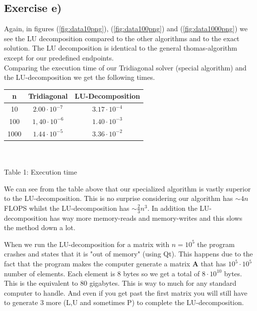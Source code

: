 \documentclass{article}
\begin{document}
  \subsection{Exercise e)} \label{Results e)}

  Again, in figures (\ref{fig:data10png}), (\ref{fig:data100png}) and (\ref{fig:data1000png}) we see the LU decomposition compared to the other algorithms and to the exact solution. The LU decomposition is identical to the general thomas-algorithm except for our predefined endpoints.\\
  Comparing the execution time of our Tridiagonal solver (special algorithm) and the LU-decomposition we get the following times.
  \begin{center} \label{tab:exec_time}
      \begin{tabular}{|c|c|c|}
        \hline
        n    &   Tridiagonal      &  LU-Decomposition  \\
        \hline\hline
        10   & $2.00\cdot10^{-7}$ & $3.17\cdot10^{-4}$ \\
        100  & $1,40\cdot10^{-6}$ & $1.40\cdot10^{-3}$ \\
        1000 & $1.44\cdot10^{-5}$ & $3.36\cdot10^{-2}$ \\
        \hline
      \end{tabular} \\
      \hspace{0pt}\\
      Table 1: Execution time
  \end{center}
  We can see from the table above that our specialized algorithm is vastly superior to the LU-decomposition. This is no surprise considering our algorithm has $\sim4n$ FLOPS whilst the LU-decomposition has $\sim\frac{2}{3}n^3$. In addition the LU-decomposition has way more memory-reads and memory-writes and this slows the method down a lot.

  When we run the LU-decomposition for a matrix with $n = 10^5$ the program crashes and states that it is "out of memory" (using Qt). This happens due to the fact that the program makes the computer generate a matrix \textbf{A} that has $10^5 \cdot 10^5$ number of elements. Each element is 8 bytes so we get a total of $8 \cdot 10^{10}$ bytes. This is the equivalent to $80$ gigabytes. This is way to much for any standard computer to handle. And even if you get past the first matrix you will still have to generate 3 more (L,U and sometimes P) to complete the LU-decomposition.
\end{document}
